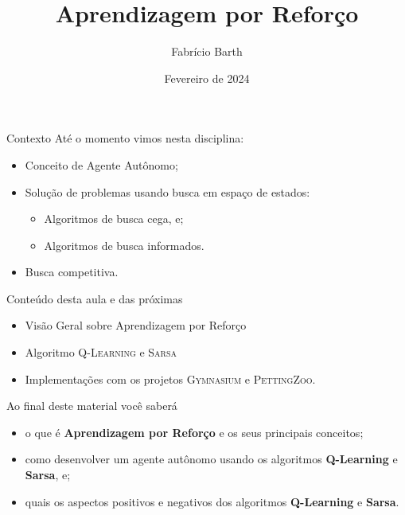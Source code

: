 \documentclass{beamer}
\begin{document}
\title{Aprendizagem por Reforço} 
\author{Fabrício Barth}
\date{Fevereiro de 2024}

\maketitle

\begin{frame}{Contexto}
Até o momento vimos nesta disciplina:
\begin{itemize}
	\item Conceito de Agente Autônomo;
	\item Solução de problemas usando busca em espaço de estados:
	\begin{itemize}
		\item Algoritmos de busca cega, e;
		\item Algoritmos de busca informados.
	\end{itemize}
	\item Busca competitiva.
\end{itemize}
\end{frame}

\begin{frame}{Conteúdo desta aula e das próximas}
  \begin{itemize}
\item Visão Geral sobre Aprendizagem por Reforço
\item Algoritmo \textsc{Q-Learning} e \textsc{Sarsa}
\item Implementações com os projetos \textsc{Gymnasium} e \textsc{PettingZoo}.
  \end{itemize}
\end{frame}

\begin{frame}{Ao final deste material você saberá}

	\begin{itemize}
	\item o que é \textbf{Aprendizagem por Reforço} e os seus principais conceitos;
	\item como desenvolver um agente autônomo usando os algoritmos \textbf{Q-Learning} e \textbf{Sarsa}, e;
	\item quais os aspectos positivos e negativos dos algoritmos \textbf{Q-Learning} e \textbf{Sarsa}.
	\end{itemize}

\end{frame}
\end{document}
